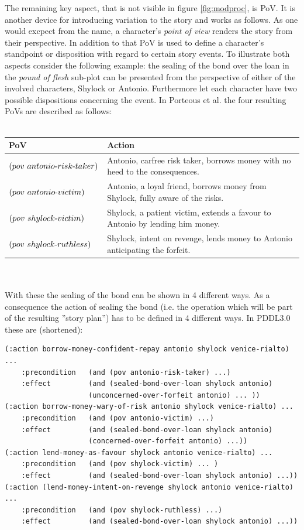 The remaining key aspect, that is not visible in figure \ref{fig:modproc}, is PoV. It is another device for introducing variation to the story and works as follows. As one would excpect from the name, a character's \emph{point of view} renders the story from their perspective. In addition to that PoV is used to define a character's standpoint or disposition with regard to certain story events. To illustrate both aspects consider the following example: the sealing of the bond over the loan in the \emph{pound of flesh} sub-plot can be presented from the perspective of either of the involved characters, Shylock or Antonio. Furthermore let each character have two possible dispositions concerning the event. In Porteous et al. \cite{Porteous10} the four resulting PoVs are described as follows:\\
\\
\begin{tabular}{|p{4.5cm}|p{8.5cm}|}
\hline
PoV & Action \\
\hline\hline
$(pov\ antonio\text{-} risk\text{-} taker)$ & Antonio, carfree risk taker, borrows money with no heed to the consequences.\\
\hline
$(pov\ antonio\text{-} victim)$ & Antonio, a loyal friend, borrows money from Shylock, fully aware of the risks.\\
\hline
$(pov\ shylock\text{-} victim)$ & Shylock, a patient victim, extends a favour to Antonio by lending him money.\\
\hline
$(pov\ shylock\text{-} ruthless)$ & Shylock, intent on revenge, lends money to Antonio anticipating the forfeit.\\
\hline
\end{tabular}\\
\\
With these the sealing of the bond can be shown in 4 different ways. As a consequence the action of sealing the bond (i.e. the operation which will be part of the resulting ''story plan'') has to be defined in 4 different ways. In PDDL3.0 these are (shortened):
\begin{lstlisting}[frame=single,basicstyle=\scriptsize]
(:action borrow-money-confident-repay antonio shylock venice-rialto) ...
    :precondition   (and (pov antonio-risk-taker) ...)
    :effect         (and (sealed-bond-over-loan shylock antonio)
                    (unconcerned-over-forfeit antonio) ... ))
(:action borrow-money-wary-of-risk antonio shylock venice-rialto) ...
    :precondition   (and (pov antonio-victim) ...)
    :effect         (and (sealed-bond-over-loan shylock antonio)
                    (concerned-over-forfeit antonio) ...))
(:action lend-money-as-favour shylock antonio venice-rialto) ...
    :precondition   (and (pov shylock-victim) ... )
    :effect         (and (sealed-bond-over-loan shylock antonio) ...))
(:action (lend-money-intent-on-revenge shylock antonio venice-rialto) ...
    :precondition   (and (pov shylock-ruthless) ...)
    :effect         (and (sealed-bond-over-loan shylock antonio) ...))
\end{lstlisting}
